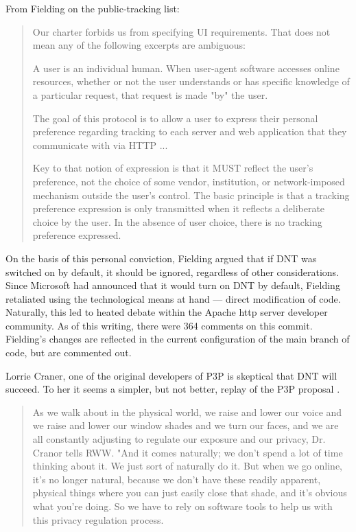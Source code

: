 From Fielding on the public-tracking list:

\begin{quotation}
Our charter forbids us from specifying UI requirements. That does not mean any of the following excerpts are ambiguous:     

A user is an individual human. When user-agent software accesses online resources, whether or not the user understands or has specific knowledge of a particular request, that request is made "by" the user.

The goal of this protocol is to allow a user to express their personal preference regarding tracking to each server and web application that they communicate with via HTTP ...    

Key to that notion of expression is that it MUST reflect the user's preference, not the choice of some vendor, institution, or network-imposed mechanism outside the user's control. The basic principle is that a tracking preference expression is only transmitted when it reflects a deliberate choice by the user. In the absence of user choice, there is no tracking preference expressed. \citep{Fielding:2012vf}
\end{quotation}

On the basis of this personal conviction, Fielding argued that if DNT was switched on by default, it should be ignored, regardless of other considerations. Since Microsoft had announced that it would turn on DNT by default, Fielding retaliated using the technological means at hand --- direct modification of code. Naturally, this led to heated debate within the Apache http server developer community. As of this writing, there were 364 comments on this commit. Fielding's changes are reflected in the current configuration of the main branch of code, but are commented out.

Lorrie Craner, one of the original developers of P3P is skeptical that DNT will succeed. To her it seems a simpler, but not better, replay of the P3P proposal  \citep{Staff:2012th, Fulton:2012ti}. 

\begin{quote}
As we walk about in the physical world, we raise and lower our voice and we raise and lower our window shades and we turn our faces, and we are all constantly adjusting to regulate our exposure and our privacy, Dr. Cranor tells RWW. "And it comes naturally; we don't spend a lot of time thinking about it. We just sort of naturally do it. But when we go online, it's no longer natural, because we don't have these readily apparent, physical things where you can just easily close that shade, and it's obvious what you're doing. So we have to rely on software tools to help us with this privacy regulation process. \citep{Fulton:2012ti}
\end{quote}


